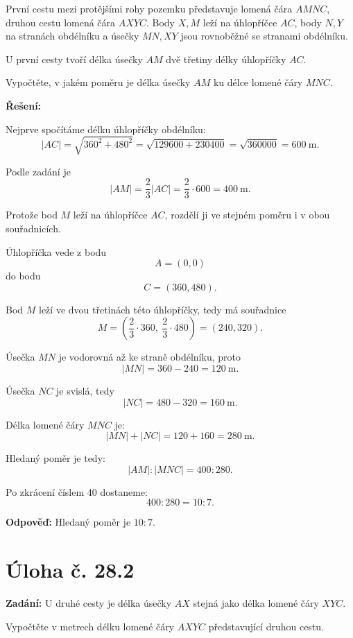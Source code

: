 \documentclass[12pt,a4paper]{article}
\begin{document}
První cestu mezi protějšími rohy pozemku představuje lomená čára \(AMNC\), druhou cestu lomená čára \(AXYC\). Body \(X, M\) leží na úhlopříčce \(AC\), body \(N, Y\) na stranách obdélníku a úsečky \(MN, XY\) jsou rovnoběžné se stranami obdélníku.

U první cesty tvoří délka úsečky \(AM\) dvě třetiny délky úhlopříčky \(AC\).

Vypočtěte, v jakém poměru je délka úsečky \(AM\) ku délce lomené čáry \(MNC\).

\bigskip

\textbf{Řešení:}

Nejprve spočítáme délku úhlopříčky obdélníku:
\[
|AC|=\sqrt{360^2+480^2}
=\sqrt{129600+230400}
=\sqrt{360000}
=600\ \mathrm{m}.
\]

Podle zadání je
\[
|AM|=\frac{2}{3}|AC|=\frac{2}{3}\cdot 600=400\ \mathrm{m}.
\]

\medskip

Protože bod \(M\) leží na úhlopříčce \(AC\), rozdělí ji ve stejném poměru i v obou souřadnicích.

Úhlopříčka vede z bodu
\[
A=(0,0)
\]
do bodu
\[
C=(360,480).
\]

Bod \(M\) leží ve dvou třetinách této úhlopříčky, tedy má souřadnice
\[
M=\left(\frac{2}{3}\cdot 360,\ \frac{2}{3}\cdot 480\right)=(240,320).
\]

Úsečka \(MN\) je vodorovná až ke straně obdélníku, proto
\[
|MN|=360-240=120\ \mathrm{m}.
\]

Úsečka \(NC\) je svislá, tedy
\[
|NC|=480-320=160\ \mathrm{m}.
\]

Délka lomené čáry \(MNC\) je:
\[
|MN|+|NC|=120+160=280\ \mathrm{m}.
\]

Hledaný poměr je tedy:
\[
|AM|:|MNC|=400:280.
\]

Po zkrácení číslem 40 dostaneme:
\[
400:280=10:7.
\]

\bigskip

\textbf{Odpověď:}  
Hledaný poměr je \(10:7\).

\section*{Úloha č. 28.2}

\textbf{Zadání:}  
U druhé cesty je délka úsečky \(AX\) stejná jako délka lomené čáry \(XYC\).

Vypočtěte v metrech délku lomené čáry \(AXYC\) představující druhou cestu.

\bigskip
\end{document}
